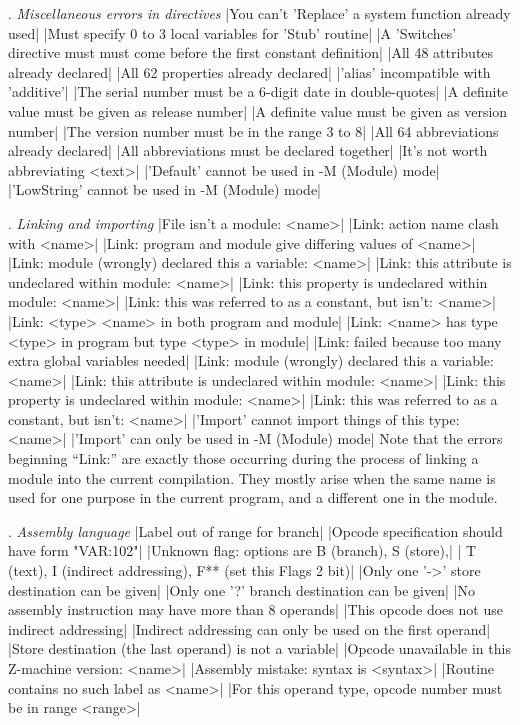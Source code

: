 \medskip{}. {\sl Miscellaneous errors in directives}
\beginlines
|You can't 'Replace' a system function already used|
|Must specify 0 to 3 local variables for 'Stub' routine|
|A 'Switches' directive must must come before the first constant definition|
|All 48 attributes already declared|
|All 62 properties already declared|
|'alias' incompatible with 'additive'|
|The serial number must be a 6-digit date in double-quotes|
|A definite value must be given as release number|
|A definite value must be given as version number|
|The version number must be in the range 3 to 8|
|All 64 abbreviations already declared|
|All abbreviations must be declared together|
|It's not worth abbreviating <text>|
|'Default' cannot be used in -M (Module) mode|
|'LowString' cannot be used in -M (Module) mode|
\endlines

\medskip{}. {\sl Linking and importing}
\beginlines
|File isn't a module: <name>|
|Link: action name clash with <name>|
|Link: program and module give differing values of <name>|
|Link: module (wrongly) declared this a variable: <name>|
|Link: this attribute is undeclared within module: <name>|
|Link: this property is undeclared within module: <name>|
|Link: this was referred to as a constant, but isn't: <name>|
|Link: <type> <name> in both program and module|
|Link: <name> has type <type> in program but type <type> in module|
|Link: failed because too many extra global variables needed|
|Link: module (wrongly) declared this a variable: <name>|
|Link: this attribute is undeclared within module: <name>|
|Link: this property is undeclared within module: <name>|
|Link: this was referred to as a constant, but isn't: <name>|
|'Import' cannot import things of this type: <name>|
|'Import' can only be used in -M (Module) mode|
\endlines
Note that the errors beginning ``Link:'' are exactly those occurring
during the process of linking a module into the current compilation.
They mostly arise when the same name is used for one purpose in the
current program, and a different one in the module.

\medskip{}. {\sl Assembly language}
\beginlines
|Label out of range for branch|
|Opcode specification should have form "VAR:102"|
|Unknown flag: options are B (branch), S (store),|
|    T (text), I (indirect addressing), F** (set this Flags 2 bit)|
|Only one '->' store destination can be given|
|Only one '?' branch destination can be given|
|No assembly instruction may have more than 8 operands|
|This opcode does not use indirect addressing|
|Indirect addressing can only be used on the first operand|
|Store destination (the last operand) is not a variable|
|Opcode unavailable in this Z-machine version: <name>|
|Assembly mistake: syntax is <syntax>|
|Routine contains no such label as <name>|
|For this operand type, opcode number must be in range <range>|
\endlines

